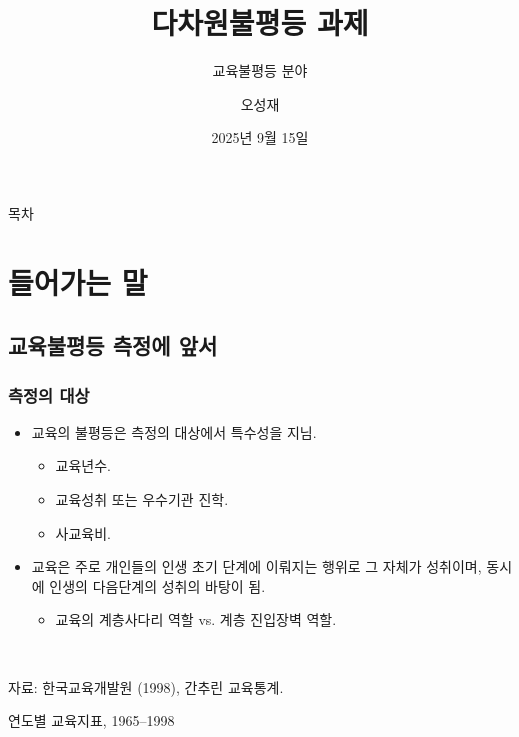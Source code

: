 \documentclass[aspectratio=169,xcolor=dvipsnames,handout]{beamer}
\title{다차원불평등 과제}
\subtitle{교육불평등 분야}
\author{오성재}
\institute[KIHASA]
    {%
        국회입법조사처
    }
\date{2025년 9월 15일}
\begin{document}

\frame{\titlepage}

\begin{frame}{목차}
    \setcounter{tocdepth}{1}
    \tableofcontents
\end{frame}

\section{들어가는 말}
\subsection{교육불평등 측정에 앞서}
\begin{frame}[<+->]
\frametitle{측정의 대상}
    \begin{itemize}
        \item 교육의 불평등은 측정의 대상에서 특수성을 지님.
        \begin{itemize}[<+->]
            \item 교육년수.
            \item 교육성취 또는 우수기관 진학.
            \item 사교육비.
        \end{itemize}
        \item 교육은 주로 개인들의 인생 초기 단계에 이뤄지는 행위로 그 자체가 성취이며, 동시에 인생의 다음단계의 성취의 바탕이 됨.
        \begin{itemize}[<+->]
            \item 교육의 계층사다리 역할 vs. 계층 진입장벽 역할.
        \end{itemize}
    \end{itemize}
\end{frame}

\begin{frame}[<+->]
    \begin{table}
        \centering
        \resizebox{.7\textwidth}{!}{\relax
            
        }
        \\
        \raggedright%
        \hspace{1.5em}
        \tiny{자료: 한국교육개발원 (1998), 간추린 교육통계.}
        \caption{연도별 교육지표, 1965--1998}
    \end{table}
\end{frame}
\end{document}
